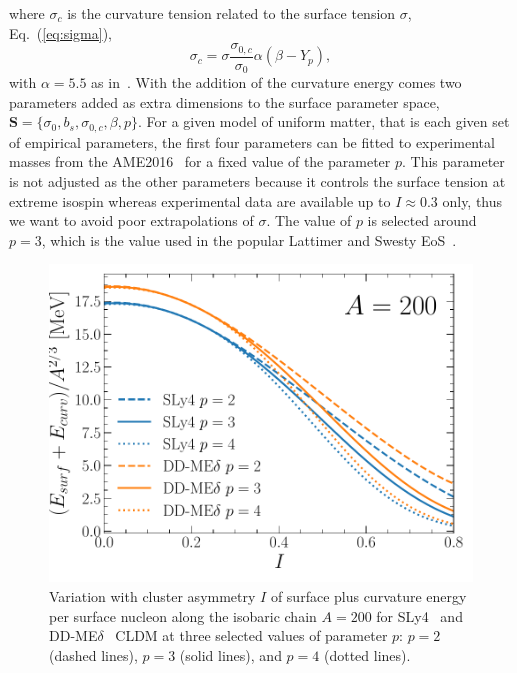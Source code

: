 %
where $\sigma_c$ is the curvature tension related to the surface tension
$\sigma$, Eq.~(\ref{eq:sigma}),
%
\begin{equation}
  \sigma_c =
  \sigma\frac{\sigma_{0,c}}{\sigma_0}\alpha(\beta-Y_p),\label{eq:sigmac}
\end{equation}
%
with $\alpha = 5.5$ as in~\cite{Newton2012}. With the addition of the
curvature energy comes two parameters added as extra dimensions to 
the surface parameter space, $\bm{S} = \{\sigma_0, b_s, \sigma_{0,c}, \beta,
p\}$. 
For a given model of uniform matter, that is each given set of empirical
parameters, the first four parameters can be fitted to experimental masses from 
the AME2016~\cite{Huang2017} for a fixed value of the parameter $p$. This parameter 
is not adjusted as the other parameters because it controls the surface tension 
at extreme isospin whereas experimental data are available up to $I \approx 0.3$ 
only, thus we want to avoid poor extrapolations of $\sigma$. The value of $p$ 
is selected around $p=3$, which is the value used in the popular Lattimer and 
Swesty EoS~\cite{Lattimer1991}.
%
\begin{figure}[!t]
\begin{center}
  \includegraphics[width=0.8\linewidth]{figures/surfenpersurfnuc.pdf}
\end{center}
\caption[Surface plus curvature energy per surface nucleon versus asymmetry]{Variation 
  with cluster asymmetry $I$ of surface plus curvature energy per
  surface nucleon along the isobaric chain $A=200$ for SLy4~\cite{Chabanat1998} and
DD-ME$\delta$~\cite{RocaMaza2011} CLDM at three selected 
values of parameter $p$: $p=2$ (dashed lines), $p=3$ (solid lines), and $p=4$
(dotted lines).}\label{fig:surfenpersurfnuc}
\end{figure}
